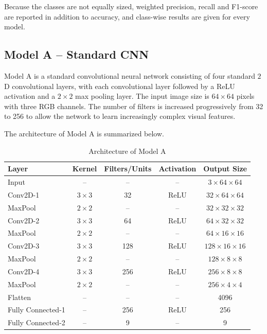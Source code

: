 \documentclass[12pt,a4paper]{article}
\begin{document}
Because the classes are not equally sized, weighted precision, recall and
F1-score are reported in addition to accuracy, and class-wise results are
given for every model.


\subsection{Model A -- Standard CNN}

Model A is a standard convolutional neural network consisting of four
standard $2$D convolutional layers, with each convolutional layer followed
by a ReLU activation and a $2\times2$ max pooling layer. The input image size
is $64\times64$ pixels with three RGB channels. The number of filters is
increased progressively from 32 to 256 to allow the network to learn
increasingly complex visual features.

The architecture of Model A is summarized below.

\begin{table}[H]
\centering
\caption{Architecture of Model A}
\label{tab:model_a_architecture}
\begin{tabular}{lcccc}
\hline
\textbf{Layer} & \textbf{Kernel} & \textbf{Filters/Units} &
\textbf{Activation} & \textbf{Output Size} \\
\hline
Input & -- & -- & -- & $3\times64\times64$ \\
Conv2D-1 & $3\times3$ & 32 & ReLU & $32\times64\times64$ \\
MaxPool & $2\times2$ & -- & -- & $32\times32\times32$ \\
Conv2D-2 & $3\times3$ & 64 & ReLU & $64\times32\times32$ \\
MaxPool & $2\times2$ & -- & -- & $64\times16\times16$ \\
Conv2D-3 & $3\times3$ & 128 & ReLU & $128\times16\times16$ \\
MaxPool & $2\times2$ & -- & -- & $128\times8\times8$ \\
Conv2D-4 & $3\times3$ & 256 & ReLU & $256\times8\times8$ \\
MaxPool & $2\times2$ & -- & -- & $256\times4\times4$ \\
Flatten & -- & -- & -- & 4096 \\
Fully Connected-1 & -- & 256 & ReLU & 256 \\
Fully Connected-2 & -- & 9 & -- & 9 \\
\hline
\end{tabular}
\end{table}
\end{document}
